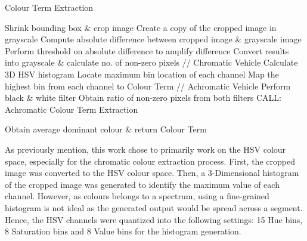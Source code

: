  \begin{algorithm}[!ht]
  \caption{Colour Term Extraction}
  \label{algo:colorExtract}
  \begin{algorithmic}[1]
        \STATE Shrink bounding box \& crop image
        \STATE Create a copy of the cropped image in grayscale
        \STATE Compute absolute difference between cropped image \& grayscale image
        \STATE Perform threshold on absolute difference to amplify difference
        \STATE Convert results into grayscale \& calculate no. of non-zero pixels
                \STATE // Chromatic Vehicle
                \STATE Calculate 3D HSV histogram
                \STATE Locate maximum bin location of each channel
                \STATE Map the highest bin from each channel to Colour Term
            \ELSE
                \STATE // Achromatic Vehicle
                \STATE Perform black \& white filter
                \STATE Obtain ratio of non-zero pixels from both filters
                \STATE CALL: Achromatic Colour Term Extraction
            \ENDIF

    \ENDFOR
    \STATE Obtain average dominant colour \& return Colour Term
  \end{algorithmic}
\end{algorithm}


As previously mention, this work chose to primarily work on the HSV colour space, especially for the chromatic colour extraction process. First, the cropped image was converted to the HSV colour space. Then, a 3-Dimensional histogram of the cropped image was generated to identify the maximum value of each channel. However, as colours belongs to a spectrum, using a fine-grained histogram is not ideal as the generated output would be spread across a segment. Hence, the HSV channels were quantized into the following settings: 15 Hue bins, 8 Saturation bins and 8 Value bins for the histogram generation.






